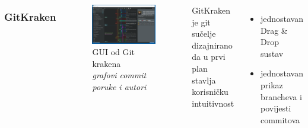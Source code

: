 \documentclass[hyperref={bookmarks=false},aspectratio=169]{beamer}
\begin{document}
\begin{frame}
\begin{columns}
\frametitle{GitKraken}
\begin{figure}


\includegraphics[width=\columnwidth]{./figures/git_kraken.png}
    \centering
    \caption{GUI od Git krakena  \emph{\\grafovi commit poruke i autori}}
\end{figure}
    GitKraken je git sučelje dizajnirano da u prvi plan stavlja korisničku intuitivnost
\begin{itemize}
    \item jednostavan Drag & Drop sustav
    \item jednostavan prikaz brancheva i povijesti commitova
\end{itemize}
\end{columns}

\end{frame}
\end{document}
